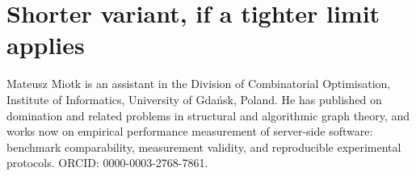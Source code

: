 \documentclass[11pt,a4paper]{article}
\begin{document}
\section*{Shorter variant, if a tighter limit applies}

Mateusz Miotk is an assistant in the Division of Combinatorial Optimisation, Institute of Informatics, University of Gdańsk, Poland. He has published on domination and related problems in structural and algorithmic graph theory, and works now on empirical performance measurement of server-side software: benchmark comparability, measurement validity, and reproducible experimental protocols. ORCID: 0000-0003-2768-7861.
\end{document}
